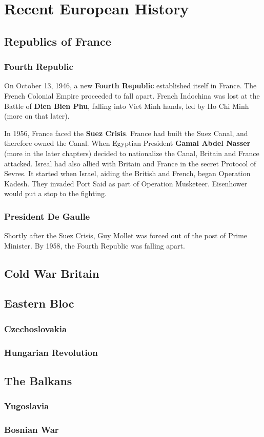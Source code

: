 \chapter{Recent European History}

\section{Republics of France}

\subsection*{Fourth Republic}

On October 13, 1946, a new \textbf{Fourth Republic} established itself in France.
The French Colonial Empire proceeded to fall apart.
French Indochina was lost at the Battle of \textbf{Dien Bien Phu},
falling into Viet Minh hands, led by Ho Chi Minh (more on that later).

In 1956, France faced the \textbf{Suez Crisis}.
France had built the Suez Canal, and therefore owned the Canal.
When Egyptian President \textbf{Gamal Abdel Nasser} (more in the later chapters)
decided to nationalize the Canal, Britain and France attacked.
Isreal had also allied with Britain and France in the secret Protocol of Sevres.
It started when Israel, aiding the British and French, began Operation Kadesh.
They invaded Port Said as part of Operation Musketeer.
Eisenhower would put a stop to the fighting.

\subsection*{President De Gaulle}

Shortly after the Suez Crisis, Guy Mollet was forced out of the post of Prime Minister.
By 1958, the Fourth Republic was falling apart.

\section{Cold War Britain}

\section{Eastern Bloc}

\subsection*{Czechoslovakia}

\subsection*{Hungarian Revolution}

\section{The Balkans}

\subsection*{Yugoslavia}

\subsection*{Bosnian War}

